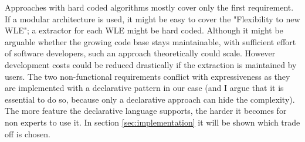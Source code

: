 Approaches with hard coded algorithms mostly cover only the first requirement. If a modular architecture is used, it might be easy to cover the "Flexibility to new WLE"; a extractor for each WLE might be hard coded. Although it might be arguable whether the growing code base stays maintainable, with sufficient effort of software developers, such an approach theoretically could scale. However development costs could be reduced drastically if the extraction is maintained by users. The two non-functional requirements conflict with expressiveness as they are implemented with a declarative pattern in our case (and I argue that it is essential to do so, because only a declarative approach can hide the complexity). The more feature the declarative language supports, the harder it becomes for non experts to use it. In section \ref{sec:implementation} it will be shown which trade off is chosen. 


\newpage
